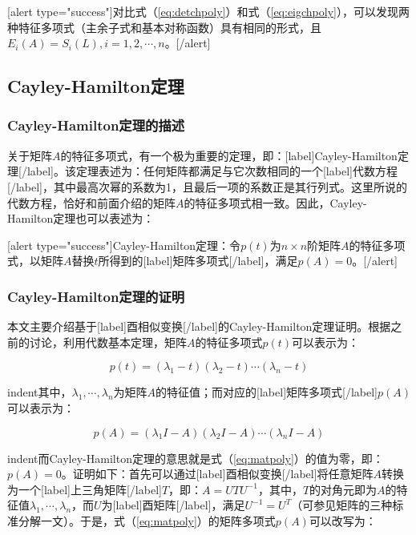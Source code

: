 \documentclass[UTF8,nofonts]{ctexart}
\begin{document}
[alert type="success"]对比式（\ref{eq:detchpoly}）和式（\ref{eq:eigchpoly}），可以发现两种特征多项式（主余子式和基本对称函数）具有相同的形式，且$E_i(A)=S_i(L),i=1,2,\cdots,n$。[/alert]

\subsection*{Cayley-Hamilton定理}

\subsubsection*{Cayley-Hamilton定理的描述}

关于矩阵$A$的特征多项式，有一个极为重要的定理，即：[label]Cayley-Hamilton定理[/label]。该定理表述为：任何矩阵都满足与它次数相同的一个[label]代数方程[/label]，其中最高次幂的系数为1，且最后一项的系数正是其行列式。这里所说的代数方程，恰好和前面介绍的矩阵$A$的特征多项式相一致。因此，Cayley-Hamilton定理也可以表述为：

[alert type="success"]Cayley-Hamilton定理：令$p(t)$为$n \times n$阶矩阵$A$的特征多项式，以矩阵$A$替换$t$所得到的[label]矩阵多项式[/label]，满足$p(A)=0$。[/alert]

\subsubsection*{Cayley-Hamilton定理的证明}

本文主要介绍基于[label]酉相似变换[/label]的Cayley-Hamilton定理证明。根据之前的讨论，利用代数基本定理，矩阵$A$的特征多项式$p(t)$可以表示为：

\[p(t)=(\lambda_1-t)(\lambda_2-t)\cdots(\lambda_n-t)\]

indent其中，$\lambda_1,\cdots,\lambda_n$为矩阵$A$的特征值；而对应的[label]矩阵多项式[/label]$p(A)$可以表示为：

\begin{equation}
\label{eq:matpoly}
p(A)=(\lambda_1I-A)(\lambda_2I-A)\cdots(\lambda_nI-A)
\end{equation}

indent而Cayley-Hamilton定理的意思就是式（\ref{eq:matpoly}）的值为零，即：$p(A)=0$。证明如下：首先可以通过[label]酉相似变换[/label]将任意矩阵$A$转换为一个[label]上三角矩阵[/label]$T$，即：$A=UTU^{-1}$，其中，$T$的对角元即为$A$的特征值$\lambda_1,\cdots,\lambda_n$，而$U$为[label]酉矩阵[/label]，满足$U^{-1}=U^T$（可参见矩阵的三种标准分解一文）。于是，式（\ref{eq:matpoly}）的矩阵多项式$p(A)$可以改写为：
\end{document}
